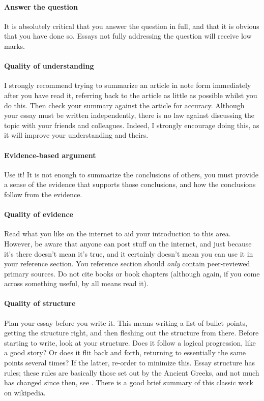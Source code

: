 \documentclass[11pt]{article}
\begin{document}
\paragraph{Answer the question} It is absolutely critical that you answer the question in full, and that it is obvious that you have done so. Essays not fully addressing the question will receive low marks. 

\paragraph{Quality of understanding} I strongly recommend trying to summarize an article in note form immediately after you have read it, referring back to the article as little as possible whilst you do this. Then check your summary against the article for accuracy. Although your essay must be written independently, there is no law against discussing the topic with your friends and colleagues. Indeed, I strongly encourage doing this, as it will improve your understanding and theirs.

\paragraph{Evidence-based argument} Use it! It is not enough to summarize the conclusions of others, you must provide a sense of the evidence that supports those conclusions, and how the conclusions follow from the evidence.

\paragraph{Quality of evidence} Read what you like on the internet to aid your introduction to this area. However, be aware that anyone can post stuff on the internet, and just because it's there doesn't mean it's true, and it certainly doesn't mean you can use it in your reference section. You reference section should \emph{only} contain peer-reviewed primary sources. Do not cite books or book chapters (although again, if you come across something useful, by all means read it).

\paragraph{Quality of structure} Plan your essay before you write it. This means writing a list of bullet points, getting the structure right, and then fleshing out the structure from there. Before starting to write, look at your structure. Does it follow a logical progression, like a good story? Or does it flit back and forth, returning to essentially the same points several times? If the latter, re-order to minimize this. Essay structure has rules; these rules are basically those set out by the Ancient Greeks, and not much has changed since then, see . There is a good brief summary of this classic work on wikipedia.
\end{document}
